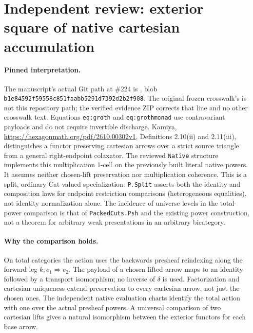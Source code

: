\documentclass{article}
\begin{document}
\section*{Independent review: exterior square of native cartesian accumulation}
\paragraph{Pinned interpretation.} The manuscript's actual Git path at
\#224 is ,
blob \texttt{b1e84592f59558c851faabb5291d7392d2b2f908}.
The original frozen crosswalk's  is not this
repository path; the verified evidence ZIP corrects that line and no other crosswalk text. Equations \texttt{eq:groth} and \texttt{eq:grothmonad}
use contravariant payloads and do not require invertible discharge.
Kamiya, \url{https://hexagonmath.org/pdf/2610.00302v1}, Definitions
2.10(ii) and 2.11(iii), distinguishes a functor preserving cartesian
arrows over a strict source triangle from a general right-endpoint
colaxator. The reviewed \texttt{Native} structure implements this
multiplication 1-cell on the previously built literal native powers.
It assumes neither chosen-lift preservation nor multiplication coherence.
This is a split, ordinary Cat-valued specialization: \texttt{P.Split}
asserts both the identity and composition laws for endpoint restriction
comparisons (heterogeneous equalities), not identity normalization alone.
The incidence of universe levels in the total-power comparison is that of
\texttt{PackedCuts.Psh} and the existing power construction, not a theorem
for arbitrary weak presentations in an arbitrary bicategory.
\paragraph{Why the comparison holds.} On total categories the action
uses the backwards presheaf reindexing along the forward leg
$k;e_1\Rightarrow e_2$. The payload of a chosen lifted arrow maps to an
identity followed by a transport isomorphism; no inverse of $\delta$ is
used. Factorization and cartesian uniqueness extend preservation to every
cartesian arrow, not just the chosen ones. The independent native evaluation
charts identify the total action with one over the actual presheaf powers.
A universal comparison of two cartesian lifts gives a natural isomorphism
between the exterior functors for each base arrow.
\end{document}
